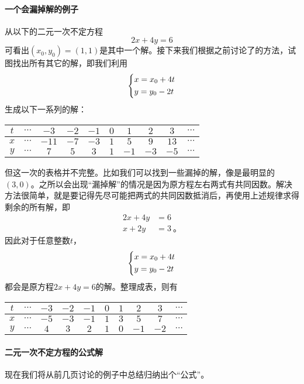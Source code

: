 \documentclass[a4,12pt]{article}
\begin{document}
\paragraph{一个会漏掉解的例子}
	从以下的二元一次不定方程
	\[ 2x + 4y = 6 \]
	可看出$(x_0, y_0) = (1, 1)$是其中一个解。接下来我们根据之前讨论了的方法，试图找出所有其它的解，即我们利用
	\[ \begin{dcases}
			x = x_0 + 4t \\
			y = y_0 - 2t
		\end{dcases}
	\]
	生成以下一系列的解：
	\begin{center}
	\begin{tabular}{c|ccccccccc}
		$t$ & $\cdots$ & $-3$ & $-2$ & $-1$ & $0$ & $1$ & $2$ & $3$ & $\cdots$ \\
		\hline
		$x$ & $\cdots$ & $-11$ & $-7$ & $-3$ & $1$ & $5$ & $9$ & $13$ & $\cdots$ \\
		$y$ & $\cdots$ & $7$ & $5$ & $3$ & $1$ & $-1$ & $-3$ & $-5$ & $\cdots$ \\
	\end{tabular}
	\end{center}
	但这一次的表格并不完整。比如我们可以找到一些漏掉的解，像是最明显的$(3, 0)$。之所以会出现“漏掉解”的情况是因为原方程左右两式有共同因数。解决方法很简单，就是要记得先尽可能把两式的共同因数抵消后，再使用上述规律求得剩余的所有解，即
	\[ \begin{aligned}
			2x + 4y &= 6 \\
			x + 2y &= 3 \ \mbox{。}
		\end{aligned}
	\]
	因此对于任意整数$t$，
	\[ \begin{dcases}
			x = x_0 + 4t \\
			y = y_0 - 2t
		\end{dcases}
	\]
	都会是原方程$2x + 4y = 6$的解。整理成表，则有
	\begin{center}
	\begin{tabular}{c|ccccccccc}
		$t$ & $\cdots$ & $-3$ & $-2$ & $-1$ & $0$ & $1$ & $2$ & $3$ & $\cdots$ \\
		\hline
		$x$ & $\cdots$ & $-5$ & $-3$ & $-1$ & $1$ & $3$ & $5$ & $7$ & $\cdots$ \\
		$y$ & $\cdots$ & $4$ & $3$ & $2$ & $1$ & $0$ & $-1$ & $-2$ & $\cdots$ \\
	\end{tabular}
	\end{center}

\paragraph{二元一次不定方程的公式解}
	现在我们将从前几页讨论的例子中总结归纳出个“公式”。
\end{document}
